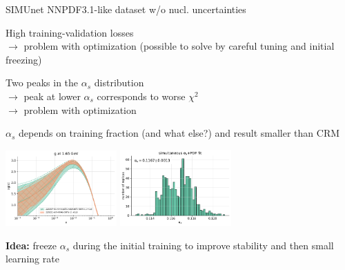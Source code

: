 \documentclass[aspectratio=169, 8pt,t]{beamer}
\begin{document}
\begin{frame}[t]{SIMUnet}
  NNPDF3.1-like dataset w/o nucl. uncertainties\\\vspace*{0.5em}

  High training-validation losses\\
  $\rightarrow$ problem with optimization {\color{red} (possible to solve by careful tuning and initial freezing)}\\\vspace*{0.5em}

  Two peaks in the $\alpha_s$ distribution \\
  $\rightarrow$ peak at lower $\alpha_s$ corresponds to worse $\chi^2$ \\
  $\rightarrow$ problem with optimization \\\vspace*{0.5em}

  $\alpha_s$ depends on training fraction (and what else?) and result smaller than CRM

  \vspace*{-8mm}
  \includegraphics[width=0.32\textwidth]{PDFnormalize0_Basespecs0_PDFscalespecs0_plot_pdfs_g_prev.pdf}
  \includegraphics[width=0.32\textwidth]{alphas_hist_prev.pdf}

  \textbf{Idea:} freeze $\alpha_s$ during the initial training to improve stability and then small learning rate

\end{frame}
\end{document}
